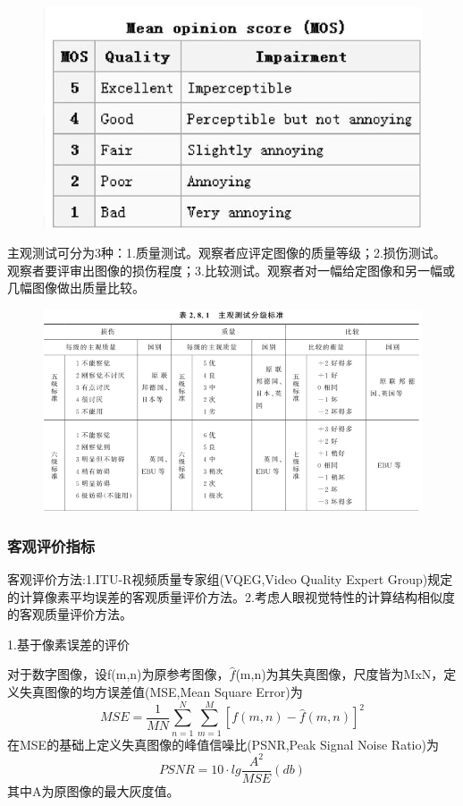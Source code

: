\documentclass[11pt]{article}
\begin{document}
\begin{figure}[h]
	\centering
	\includegraphics[scale = 0.5]{MOS}
\end{figure}

主观测试可分为3种：1.质量测试。观察者应评定图像的质量等级；2.损伤测试。观察者要评审出图像的损伤程度；3.比较测试。观察者对一幅给定图像和另一幅或几幅图像做出质量比较。
\begin{figure}[h]
	\centering
	\includegraphics[scale = 0.7]{4}
\end{figure}
\subsubsection{客观评价指标}

客观评价方法:1.ITU-R视频质量专家组(VQEG,Video Quality Expert Group)规定的计算像素平均误差的客观质量评价方法。2.考虑人眼视觉特性的计算结构相似度的客观质量评价方法。

1.基于像素误差的评价

对于数字图像，设f(m,n)为原参考图像，$\hat{f}$(m,n)为其失真图像，尺度皆为MxN，定义失真图像的均方误差值(MSE,Mean Square Error)为
$$MSE = \frac{1}{MN}\sum_{n=1}^{N}\sum_{m=1}^{M}[f(m,n)-\hat{f}(m,n)]^2$$
在MSE的基础上定义失真图像的峰值信噪比(PSNR,Peak Signal Noise Ratio)为
$$PSNR = 10\cdot lg \frac{A^2}{MSE}(db)$$
其中A为原图像的最大灰度值。
\end{document}
